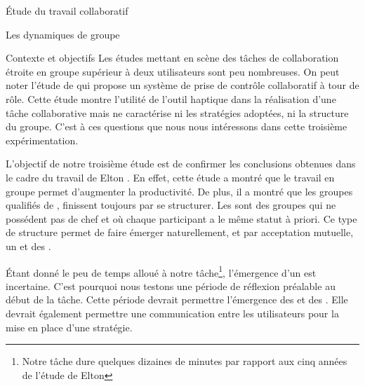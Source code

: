 \documentclass[myfrancais]{mythesis}
\begin{document}
\begin{mypart}{Étude du travail collaboratif}
\begin{mychapter}{Les dynamiques de groupe}
\begin{mysection}{Contexte et objectifs}
				Les études mettant en scène des tâches de collaboration étroite en groupe supérieur à deux utilisateurs sont peu nombreuses.
				On peut noter l'étude de  qui propose un système de prise de contrôle collaboratif à tour de rôle.
				Cette étude montre l'utilité de l'outil haptique dans la réalisation d'une tâche collaborative mais ne caractérise ni les stratégies adoptées, ni la structure du groupe.
				C'est à ces questions que nous nous intéressons dans cette troisième expérimentation.

				L'objectif de notre troisième étude est de confirmer les conclusions obtenues dans le cadre du travail de Elton .
				En effet, cette étude a montré que le travail en groupe permet d'augmenter la productivité.
				De plus, il a montré que les groupes qualifiés de , finissent toujours par se structurer.
				Les  sont des groupes qui ne possédent pas de chef et où chaque participant a le même statut à priori.
				Ce type de structure permet de faire émerger naturellement, et par acceptation mutuelle, un  et des .

				Étant donné le peu de temps alloué à notre tâche\footnote{Notre tâche dure quelques dizaines de minutes par rapport aux cinq années de l'étude de Elton }, l'émergence d'un  est incertaine.
				C'est pourquoi nous testons une période de réflexion préalable au début de la tâche.
				Cette période devrait permettre l'émergence des  et des .
				Elle devrait également permettre une communication entre les utilisateurs pour la mise en place d'une stratégie.


\end{mysection}
\end{mychapter}
\end{mypart}
\end{document}
